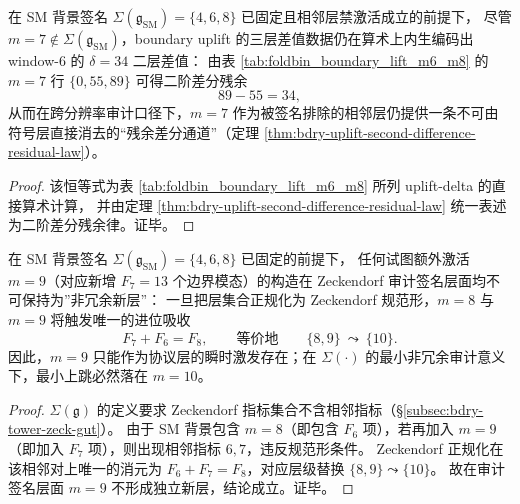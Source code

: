 \begin{proposition}[相邻层禁激活下的 uplift 残余中介：\texorpdfstring{$m=7$}{m=7} 的二阶差分回注]\label{prop:sm-uplift-residual-mediator-m7}
在 SM 背景签名 \(\Sigma(\mathfrak g_{\mathrm{SM}})=\{4,6,8\}\) 已固定且相邻层禁激活成立的前提下，
尽管 \(m=7\notin\Sigma(\mathfrak g_{\mathrm{SM}})\)，boundary uplift 的三层差值数据仍在算术上内生编码出 window-\(6\) 的 \(\delta=34\) 二层差值：
由表 \ref{tab:foldbin_boundary_lift_m6_m8} 的 \(m=7\) 行 \(\{0,55,89\}\) 可得二阶差分残余
\[
89-55=34,
\]
从而在跨分辨率审计口径下，\(m=7\) 作为被签名排除的相邻层仍提供一条不可由符号层直接消去的“残余差分通道”（定理 \ref{thm:bdry-uplift-second-difference-residual-law}）。
\end{proposition}
\begin{proof}
该恒等式为表 \ref{tab:foldbin_boundary_lift_m6_m8} 所列 uplift-delta 的直接算术计算，
并由定理 \ref{thm:bdry-uplift-second-difference-residual-law} 统一表述为二阶差分残余律。证毕。
\end{proof}

\begin{corollary}[协议激发层与审计签名层的分离：\texorpdfstring{$m=9$}{m=9} 的进位吸收]\label{cor:zeckendorf-carry-absorption-m9}
在 SM 背景签名 \(\Sigma(\mathfrak g_{\mathrm{SM}})=\{4,6,8\}\) 已固定的前提下，
任何试图额外激活 \(m=9\)（对应新增 \(F_7=13\) 个边界模态）的构造在 Zeckendorf 审计签名层面均不可保持为”非冗余新层”：
一旦把层集合正规化为 Zeckendorf 规范形，\(m=8\) 与 \(m=9\) 将触发唯一的进位吸收
\[
F_{7}+F_{6}=F_{8},
\qquad\text{等价地}\qquad
\{8,9\}\ \leadsto\ \{10\}.
\]
因此，\(m=9\) 只能作为协议层的瞬时激发存在；在 \(\Sigma(\cdot)\) 的最小非冗余审计意义下，最小上跳必然落在 \(m=10\)。
\end{corollary}
\begin{proof}
\(\Sigma(\mathfrak g)\) 的定义要求 Zeckendorf 指标集合不含相邻指标（\S\ref{subsec:bdry-tower-zeck-gut}）。
由于 SM 背景包含 \(m=8\)（即包含 \(F_6\) 项），若再加入 \(m=9\)（即加入 \(F_7\) 项），则出现相邻指标 \(6,7\)，违反规范形条件。
Zeckendorf 正规化在该相邻对上唯一的消元为 \(F_6+F_7=F_8\)，对应层级替换 \(\{8,9\}\leadsto\{10\}\)。
故在审计签名层面 \(m=9\) 不形成独立新层，结论成立。证毕。
\end{proof}


